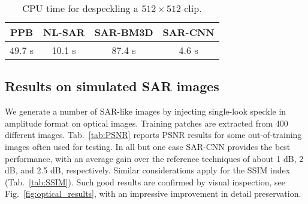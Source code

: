 \documentclass{article}
\begin{document}
\begin{table}
	\centering
	\caption{CPU time for despeckling a $512\times512$ clip.}
	\label{tab:times}
	\small
	\begin{tabular}{cccc}
		\toprule
		PPB & NL-SAR & SAR-BM3D & SAR-CNN \\
		\midrule
		49.7 s & 10.1 s & 87.4 s & 4.6 s \\
		\bottomrule
	\end{tabular}
\end{table}

\subsection{Results on simulated SAR images}

We generate a number of SAR-like images by injecting single-look speckle in amplitude format on optical images.
Training patches are extracted from 400 different images.
Tab.~\ref{tab:PSNR} reports PSNR results for some out-of-training images often used for testing.
In all but one case SAR-CNN provides the best performance, with an average gain over the reference techniques of about 1 dB, 2 dB, and 2.5 dB, respectively. Similar considerations apply for the SSIM index (Tab.~\ref{tab:SSIM}). Such good results are confirmed by visual inspection, see Fig.~\ref{fig:optical_results}, with an impressive improvement in detail preservation.

\end{document}
